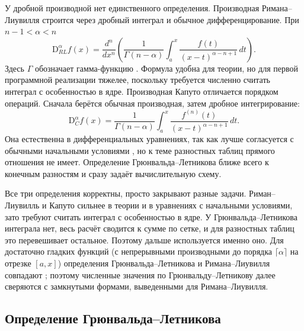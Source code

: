 \documentclass[14pt,a4paper]{extarticle}
\newcommand{\D}{\mathrm{D}}
\begin{document}
У дробной производной нет единственного определения. Производная Римана--Лиувилля строится через дробный интеграл и обычное дифференцирование. При $n-1<\alpha<n$
\begin{equation}
\D^{\alpha}_{RL}f(x)=\frac{d^n}{dx^n}\!\left(\frac{1}{\Gamma(n-\alpha)}\int_a^x\frac{f(t)}{(x-t)^{\alpha-n+1}}\,dt\right).
\end{equation}
Здесь $\Gamma$ обозначает гамма-функцию \cite{samko, podlubny}. Формула удобна для теории, но для первой программной реализации тяжелее, поскольку требуется численно считать интеграл с особенностью в ядре. Производная Капуто отличается порядком операций. Сначала берётся обычная производная, затем дробное интегрирование:
\begin{equation}
\D^{\alpha}_{C}f(x)=\frac{1}{\Gamma(n-\alpha)}\int_a^x\frac{f^{(n)}(t)}{(x-t)^{\alpha-n+1}}\,dt.
\end{equation}
Она естественна в дифференциальных уравнениях, так как лучше согласуется с обычными начальными условиями \cite{diethelm, podlubny}, но к теме разностных таблиц прямого отношения не имеет. Определение Грюнвальда--Летникова ближе всего к конечным разностям и сразу задаёт вычислительную схему.

Все три определения корректны, просто закрывают разные задачи. Риман--Лиувилль и Капуто сильнее в теории и в уравнениях с начальными условиями, зато требуют считать интеграл с особенностью в ядре. У Грюнвальда--Летникова интеграла нет, весь расчёт сводится к сумме по сетке, и для разностных таблиц это перевешивает остальное. Поэтому дальше используется именно оно. Для достаточно гладких функций (с непрерывными производными до порядка $\lceil\alpha\rceil$ на отрезке $[a,x]$) определения Грюнвальда--Летникова и Римана--Лиувилля совпадают \cite{samko, podlubny}; поэтому численные значения по Грюнвальду--Летникову далее сверяются с замкнутыми формами, выведенными для Римана--Лиувилля.

\subsection{Определение Грюнвальда--Летникова}
\end{document}
